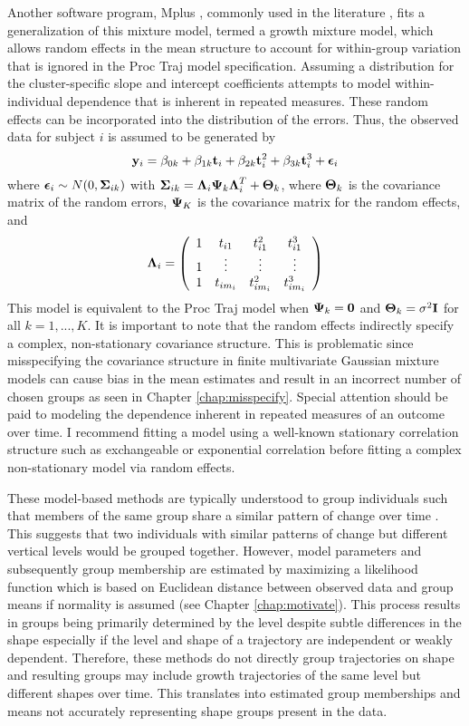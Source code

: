 Another software program, Mplus \cite{muthen2010}, commonly used in the literature \cite{li2007,garden2012}, fits a generalization of this mixture model, termed a growth mixture model, which allows random effects in the mean structure to account for within-group variation that is ignored in the Proc Traj model specification. Assuming a distribution for the cluster-specific slope and intercept coefficients attempts to model within-individual dependence that is inherent in repeated measures. These random effects can be incorporated into the distribution of the errors. Thus, the observed data for subject $i$ is assumed to be generated by
$$\mathbf y_{i} = \beta_{0k}+\beta_{1k} \mathbf t_{i} + \beta_{2k}\mathbf t_{i}^{2}+ \beta_{3k} \mathbf t_{i}^{3} +\boldsymbol \epsilon_{i}$$
where $\boldsymbol\epsilon_{i}\sim N(0,\boldsymbol\Sigma_{ik})$ with $\boldsymbol\Sigma_{ik}=\boldsymbol\Lambda_{i}\boldsymbol\Psi_{k}\boldsymbol\Lambda_{i}^{T}+\boldsymbol\Theta_{k}$, where $\boldsymbol\Theta_{k}$ is the covariance matrix of the random errors, $\boldsymbol\Psi_{K}$ is the covariance matrix for the random effects, and $$\boldsymbol\Lambda_{i}=\left(\begin{array}{cccc}1&t_{i1}&t_{i1}^{2}&t_{i1}^{3}\\ 1&\vdots&\vdots&\vdots\\ 1&t_{im_{i}}&t_{im_{i}}^{2}&t_{im_{i}}^{3} \end{array} \right)$$
This model is equivalent to the Proc Traj model when $\boldsymbol\Psi_{k}=\mathbf 0$ and $\boldsymbol\Theta_{k}=\sigma^{2}\mathbf I$ for all $k=1,...,K$. It is important to note that the random effects indirectly specify a complex, non-stationary covariance structure. This is problematic since misspecifying the covariance structure in finite multivariate Gaussian mixture models can cause bias in the mean estimates and result in an incorrect number of chosen groups as seen in Chapter \ref{chap:misspecify}. Special attention should be paid to modeling the dependence inherent in repeated measures of an outcome over time. I recommend fitting a model using a well-known stationary correlation structure such as exchangeable or exponential correlation before fitting a complex non-stationary model via random effects. 

These model-based methods are typically understood to group individuals such that members of the same group share a similar pattern of change over time \cite{garden2012}. This suggests that two individuals with similar patterns of change but different vertical levels would be grouped together. However, model parameters and subsequently group membership are estimated by maximizing a likelihood function which is based on Euclidean distance between observed data and group means if normality is assumed (see Chapter \ref{chap:motivate}). This process results in groups being primarily determined by the level despite subtle differences in the shape especially if the level and shape of a trajectory are independent or weakly dependent. Therefore, these methods do not directly group trajectories on shape and resulting groups may include growth trajectories of the same level but different shapes over time. This translates into estimated group memberships and means not accurately representing shape groups present in the data.

